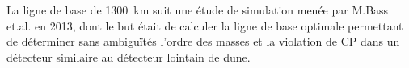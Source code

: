         La ligne de base de \SI{1300}{\kilo\meter} suit une étude de simulation menée par M.Bass et.al. en 2013\cite{Bass2013}, dont le but était de calculer la ligne de base optimale permettant de déterminer sans ambiguïtés l'ordre des masses et la violation de CP dans un détecteur similaire au détecteur lointain de \gls{dune}. %

